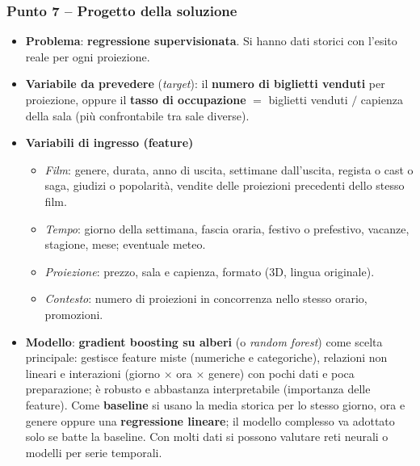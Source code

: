 \subsubsection*{Punto 7 -- Progetto della soluzione}
\begin{itemize}
    \item \textbf{Problema}: \textbf{regressione supervisionata}. Si hanno dati storici con l'esito reale per ogni proiezione.
    \item \textbf{Variabile da prevedere} (\emph{target}): il \textbf{numero di biglietti venduti} per proiezione, oppure il \textbf{tasso di occupazione} $=$ biglietti venduti $/$ capienza della sala (più confrontabile tra sale diverse).
    \item \textbf{Variabili di ingresso (feature)}
    \begin{itemize}
        \item \emph{Film}: genere, durata, anno di uscita, settimane dall'uscita, regista o cast o saga, giudizi o popolarità, vendite delle proiezioni precedenti dello stesso film.
        \item \emph{Tempo}: giorno della settimana, fascia oraria, festivo o prefestivo, vacanze, stagione, mese; eventuale meteo.
        \item \emph{Proiezione}: prezzo, sala e capienza, formato (3D, lingua originale).
        \item \emph{Contesto}: numero di proiezioni in concorrenza nello stesso orario, promozioni.
    \end{itemize}
    \item \textbf{Modello}: \textbf{gradient boosting su alberi} (o \emph{random forest}) come scelta principale: gestisce feature miste (numeriche e categoriche), relazioni non lineari e interazioni (giorno $\times$ ora $\times$ genere) con pochi dati e poca preparazione; è robusto e abbastanza interpretabile (importanza delle feature). Come \textbf{baseline} si usano la media storica per lo stesso giorno, ora e genere oppure una \textbf{regressione lineare}; il modello complesso va adottato solo se batte la baseline. Con molti dati si possono valutare reti neurali o modelli per serie temporali.
\end{itemize}

